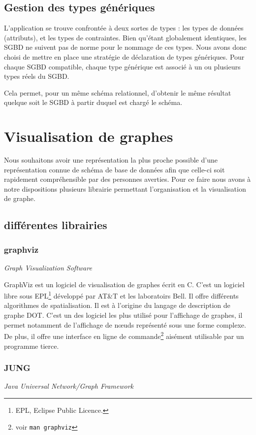 	\subsection{Gestion des types génériques}
	\label{section:generic_types}
	L'application se trouve confrontée à deux sortes de types : les types de données (attributs), et les types de contraintes. Bien qu'étant globalement identiques, les SGBD ne suivent pas de norme pour le nommage de ces types. Nous avons donc choisi de mettre en place une stratégie de déclaration de types génériques. Pour chaque SGBD compatible, chaque type générique est associé à un ou plusieurs types réels du SGBD.
	
	Cela permet, pour un même schéma relationnel, d'obtenir le même résultat quelque soit le SGBD à partir duquel est chargé le schéma.

\section{Visualisation de graphes}
	
	Nous souhaitons avoir une représentation la plus proche possible d'une représentation connue de schéma de base de données afin que celle-ci soit rapidement compréhensible par des personnes averties. Pour ce faire nous avons à notre dispositions plusieurs librairie permettant l'organisation et la visualisation de graphe.

  \subsection{différentes librairies}
  	\subsubsection{graphviz} \textit{Graph Visualization Software}
  	
			GraphViz est un logiciel de visualisation de graphes écrit en C. C'est un logiciel libre sous EPL\footnote{EPL, Eclipse Public Licence.} développé par AT\&T et les laboratoirs Bell. Il offre différents algorithmes de spatialisation. Il est à l'origine du langage de description de graphe DOT. C'est un des logiciel les plus utilisé pour l'affichage de graphes, il permet notamment de l'affichage de nœuds représenté sous une forme complexe. De plus, il offre une interface en ligne de commande\footnote{voir \texttt{man graphviz}} aisément utilisable par un programme tierce.
		\subsubsection{JUNG} \textit{Java Universal Network/Graph Framework}
		
